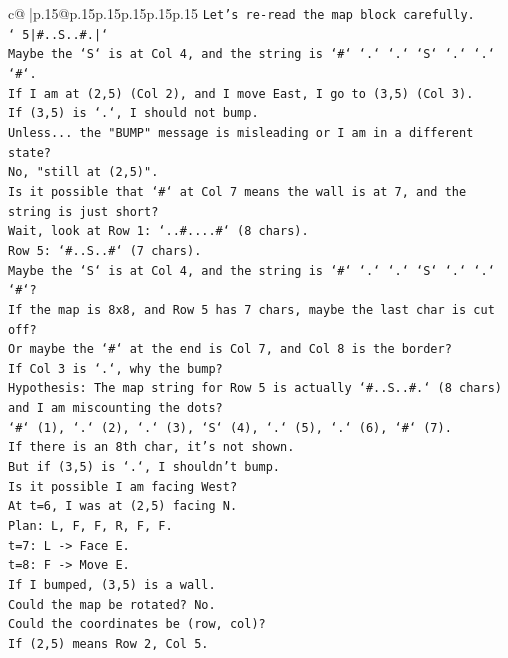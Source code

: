 \documentclass{article}
\begin{document}
{\begin{supertabular}{c@{$\;$}|p{.15\linewidth}@{}p{.15\linewidth}p{.15\linewidth}p{.15\linewidth}p{.15\linewidth}p{.15\linewidth}}
{{{\texttt{Let's re{-}read the map block carefully.} \\
\texttt{` 5|\#..S..\#.|`} \\
\texttt{Maybe the `S` is at Col 4, and the string is `\#` `.` `.` `S` `.` `.` `\#`.} \\
\texttt{If I am at (2,5) (Col 2), and I move East, I go to (3,5) (Col 3).} \\
\texttt{If (3,5) is `.`, I should not bump.} \\
\texttt{Unless... the "BUMP" message is misleading or I am in a different state?} \\
\texttt{No, "still at (2,5)".} \\
\texttt{Is it possible that `\#` at Col 7 means the wall is at 7, and the string is just short?} \\
\texttt{Wait, look at Row 1: `..\#....\#` (8 chars).} \\
\texttt{Row 5: `\#..S..\#` (7 chars).} \\
\texttt{Maybe the `S` is at Col 4, and the string is `\#` `.` `.` `S` `.` `.` `\#`?} \\
\texttt{If the map is 8x8, and Row 5 has 7 chars, maybe the last char is cut off?} \\
\texttt{Or maybe the `\#` at the end is Col 7, and Col 8 is the border?} \\
\texttt{If Col 3 is `.`, why the bump?} \\
\texttt{Hypothesis: The map string for Row 5 is actually `\#..S..\#.` (8 chars) and I am miscounting the dots?} \\
\texttt{`\#` (1), `.` (2), `.` (3), `S` (4), `.` (5), `.` (6), `\#` (7).} \\
\texttt{If there is an 8th char, it's not shown.} \\
\texttt{But if (3,5) is `.`, I shouldn't bump.} \\
\texttt{Is it possible I am facing West?} \\
\texttt{At t=6, I was at (2,5) facing N.} \\
\texttt{Plan: L, F, F, R, F, F.} \\
\texttt{t=7: L {-}> Face E.} \\
\texttt{t=8: F {-}> Move E.} \\
\texttt{If I bumped, (3,5) is a wall.} \\
\texttt{Could the map be rotated? No.} \\
\texttt{Could the coordinates be (row, col)?} \\
\texttt{If (2,5) means Row 2, Col 5.} \\
}}}
\end{supertabular}}
\end{document}
